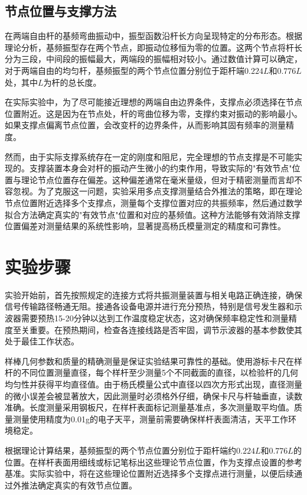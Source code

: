 ﻿\documentclass[12pt,a4paper]{article}
\begin{document}
\subsection{节点位置与支撑方法}

在两端自由杆的基频弯曲振动中，振型函数沿杆长方向呈现特定的分布形态。根据理论分析，基频振型存在两个节点，即振动位移恒为零的位置。这两个节点将杆长分为三段，中间段的振幅最大，两端段的振幅相对较小。通过数值计算可以确定，对于两端自由的均匀杆，基频振型的两个节点位置分别位于距杆端$0.224L$和$0.776L$处，其中$L$为杆的总长度。

在实际实验中，为了尽可能接近理想的两端自由边界条件，支撑点必须选择在节点位置附近。这是因为在节点处，杆的弯曲位移为零，支撑约束对振动的影响最小。如果支撑点偏离节点位置，会改变杆的边界条件，从而影响其固有频率的测量精度。

然而，由于实际支撑系统存在一定的刚度和阻尼，完全理想的节点支撑是不可能实现的。支撑装置本身会对杆的振动产生微小的约束作用，导致实际的"有效节点"位置与理论节点位置存在偏差。这种偏差通常在毫米量级，但对于精密测量而言却不容忽视。为了克服这一问题，实验采用多点支撑测量结合外推法的策略，即在理论节点位置附近选择多个支撑点，测量每个支撑位置对应的共振频率，然后通过数学拟合方法确定真实的"有效节点"位置和对应的基频值。这种方法能够有效消除支撑位置偏差对测量结果的系统性影响，显著提高杨氏模量测定的精度和可靠性。

\section{实验步骤}

实验开始前，首先按照规定的连接方式将共振测量装置与相关电路正确连接，确保信号传输路径畅通无阻。接通各设备电源并进行充分预热，特别是信号发生器和示波器需要预热15-20分钟以达到工作温度稳定状态，这对确保频率稳定性和测量精度至关重要。在预热期间，检查各连接线路是否牢固，调节示波器的基本参数使其处于最佳工作状态。

样棒几何参数和质量的精确测量是保证实验结果可靠性的基础。使用游标卡尺在样杆的不同位置测量直径，每个样杆至少测量5个不同截面的直径，以检验杆的几何均匀性并获得平均直径值。由于杨氏模量公式中直径以四次方形式出现，直径测量的微小误差会被显著放大，因此测量时必须格外仔细，确保卡尺与杆轴垂直，读数准确。长度测量采用钢板尺，在样杆表面标记测量基准点，多次测量取平均值。质量测量使用精度为0.01g的电子天平，测量前需要确保样杆表面清洁，天平工作环境稳定。

根据理论计算结果，基频振型的两个节点位置分别位于距杆端约$0.224L$和$0.776L$的位置。在样杆表面用细线或标记笔标出这些理论节点位置，作为支撑点设置的参考基准。实际实验中，将在这些理论位置附近选择多个支撑点进行测量，以便后续通过外推法确定真实的有效节点位置。
\end{document}
